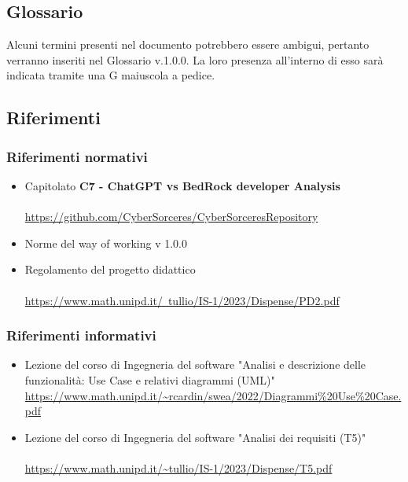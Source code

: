 \documentclass{article}
\begin{document}
\subsection*{Glossario}
Alcuni termini presenti nel documento potrebbero essere ambigui, pertanto verranno inseriti nel Glossario v.1.0.0. La loro presenza all'interno di esso sarà indicata tramite una G maiuscola a pedice.

\subsection*{Riferimenti}
\subsubsection{Riferimenti normativi}
\begin{itemize}
    \item Capitolato \textbf{C7 - ChatGPT vs BedRock developer Analysis}
    \\ \\
       \href{https://github.com/CyberSorceres/CyberSorceresRepository}{https://github.com/CyberSorceres/CyberSorceresRepository} 
    \item Norme del way of working v 1.0.0
    \item Regolamento del progetto didattico \\ \\ \href{https://www.math.unipd.it/~tullio/IS-1/2023/Dispense/PD2.pdf} 
    {https://www.math.unipd.it/~tullio/IS-1/2023/Dispense/PD2.pdf}
\end{itemize}

\subsubsection{Riferimenti informativi}
\begin{itemize}
    \item Lezione del corso di Ingegneria del software "Analisi e descrizione delle funzionalità: Use Case e relativi diagrammi (UML)" \url{https://www.math.unipd.it/~rcardin/swea/2022/Diagrammi%20Use%20Case.pdf}
    \item Lezione del corso di Ingegneria del software "Analisi dei requisiti (T5)" \\ \\
    \url{https://www.math.unipd.it/~tullio/IS-1/2023/Dispense/T5.pdf}
    
    

\end{itemize}
\end{document}
